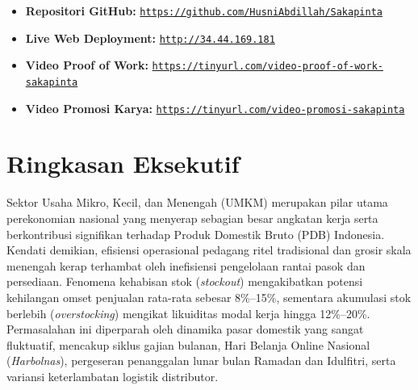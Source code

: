 \documentclass[12pt,a4paper]{article}
\begin{document}
\begin{titlepage}
    \begin{tcolorbox}[colback=sakapintaLightBg,colframe=sakapintaPrimary,title={\footnotesize \textbf{Tautan Akses Luaran \& Artefak Digital}},arc=1.5mm]
        \footnotesize
        \begin{itemize}[leftmargin=0.4cm,itemsep=1pt,topsep=0pt]
            \item \textbf{Repositori GitHub:} \href{https://github.com/HusniAbdillah/Sakapinta}{\texttt{https://github.com/HusniAbdillah/Sakapinta}}
            \item \textbf{Live Web Deployment:} \href{http://34.44.169.181}{\texttt{http://34.44.169.181}}
            \item \textbf{Video Proof of Work:} \href{https://tinyurl.com/video-proof-of-work-sakapinta}{\texttt{https://tinyurl.com/video-proof-of-work-sakapinta}}
            \item \textbf{Video Promosi Karya:} \href{https://tinyurl.com/video-promosi-sakapinta}{\texttt{https://tinyurl.com/video-promosi-sakapinta}}
        \end{itemize}
    \end{tcolorbox}
    \vfill
\end{titlepage}

\newpage
{}
\setcounter{page}{1}

\section*{Ringkasan Eksekutif}

Sektor Usaha Mikro, Kecil, dan Menengah (UMKM) merupakan pilar utama perekonomian nasional yang menyerap sebagian besar angkatan kerja serta berkontribusi signifikan terhadap Produk Domestik Bruto (PDB) Indonesia. Kendati demikian, efisiensi operasional pedagang ritel tradisional dan grosir skala menengah kerap terhambat oleh inefisiensi pengelolaan rantai pasok dan persediaan. Fenomena kehabisan stok (\textit{stockout}) mengakibatkan potensi kehilangan omset penjualan rata-rata sebesar 8\%--15\%, sementara akumulasi stok berlebih (\textit{overstocking}) mengikat likuiditas modal kerja hingga 12\%--20\%. Permasalahan ini diperparah oleh dinamika pasar domestik yang sangat fluktuatif, mencakup siklus gajian bulanan, Hari Belanja Online Nasional (\textit{Harbolnas}), pergeseran penanggalan lunar bulan Ramadan dan Idulfitri, serta variansi keterlambatan logistik distributor.
\end{document}
